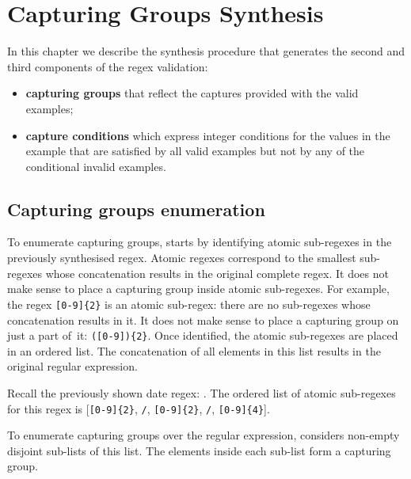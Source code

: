 \chapter{Capturing Groups Synthesis}

In this chapter we describe the synthesis procedure that generates the second and third components of the regex validation:
\begin{itemize}
    \item \textbf{capturing groups} that reflect the captures provided with the valid examples;
    \item \textbf{capture conditions} which express integer conditions for the values in the example that are satisfied by all valid examples but not by any of the conditional invalid examples. 
\end{itemize}

    
\section{Capturing groups enumeration}\label{sec:cap_groups_enumeration}
To enumerate capturing groups, \Forest starts by identifying atomic sub-regexes in the previously synthesised regex.
Atomic regexes correspond to the smallest sub-regexes whose concatenation results in the original complete regex. It does not make sense to place a capturing group inside atomic sub-regexes. For example, the regex \verb![0-9]{2}! is an atomic sub-regex: there are no sub-regexes whose concatenation results in it. It does not make sense to place a capturing group on just a part of~it: \verb!([0-9]){2}!.
Once identified, the atomic sub-regexes are placed in an ordered list. The concatenation of all elements in this list results in the original regular expression.

\begin{example}
Recall the previously shown date regex: . The ordered list of atomic sub-regexes for this regex is [\verb![0-9]{2}!, \verb!/!, \verb![0-9]{2}!, \verb!/!, \verb![0-9]{4}!].
\end{example}

To enumerate capturing groups over the regular expression, \Forest considers non-empty disjoint sub-lists of this list. The elements inside each sub-list form a capturing group.

